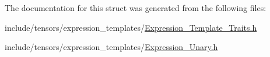 The documentation for this struct was generated from the following files\+:\begin{DoxyCompactItemize}
\item 
include/tensors/expression\+\_\+templates/\hyperlink{Expression__Template__Traits_8h}{Expression\+\_\+\+Template\+\_\+\+Traits.\+h}\item 
include/tensors/expression\+\_\+templates/\hyperlink{Expression__Unary_8h}{Expression\+\_\+\+Unary.\+h}\end{DoxyCompactItemize}
